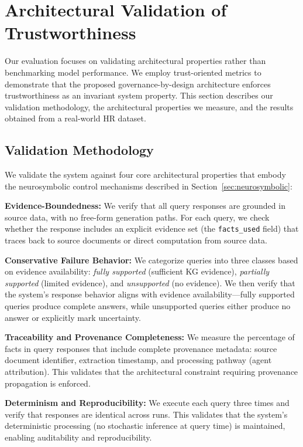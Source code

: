\section{Architectural Validation of Trustworthiness}

Our evaluation focuses on validating architectural properties rather than benchmarking model performance. We employ trust-oriented metrics to demonstrate that the proposed governance-by-design architecture enforces trustworthiness as an invariant system property. This section describes our validation methodology, the architectural properties we measure, and the results obtained from a real-world HR dataset.

\subsection{Validation Methodology}

We validate the system against four core architectural properties that embody the neurosymbolic control mechanisms described in Section~\ref{sec:neurosymbolic}:

\textbf{Evidence-Boundedness:} We verify that all query responses are grounded in source data, with no free-form generation paths. For each query, we check whether the response includes an explicit evidence set (the \texttt{facts\_used} field) that traces back to source documents or direct computation from source data.

\textbf{Conservative Failure Behavior:} We categorize queries into three classes based on evidence availability: \textit{fully supported} (sufficient KG evidence), \textit{partially supported} (limited evidence), and \textit{unsupported} (no evidence). We then verify that the system's response behavior aligns with evidence availability---fully supported queries produce complete answers, while unsupported queries either produce no answer or explicitly mark uncertainty.

\textbf{Traceability and Provenance Completeness:} We measure the percentage of facts in query responses that include complete provenance metadata: source document identifier, extraction timestamp, and processing pathway (agent attribution). This validates that the architectural constraint requiring provenance propagation is enforced.

\textbf{Determinism and Reproducibility:} We execute each query three times and verify that responses are identical across runs. This validates that the system's deterministic processing (no stochastic inference at query time) is maintained, enabling auditability and reproducibility.

